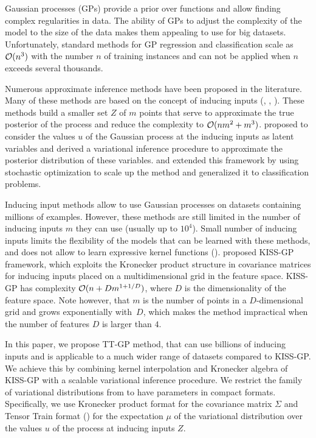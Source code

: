 Gaussian processes (GPs) provide a prior over functions and allow finding complex
regularities in data. The ability of GPs to adjust the complexity of the model
to the size of the data makes them appealing to use for big datasets.
Unfortunately, standard methods for GP regression and classification scale as
$\mathcal{O}(n^3)$ with the number $n$ of training instances and can not be applied when $n$
exceeds several thousands.

Numerous approximate inference methods have been proposed in the literature. Many
of these methods are based on the concept of inducing inputs (\citet{candela2005},
\citet{snelson2006}, \citet{williams2000}). These methods build a smaller set
$Z$ of $m$ points that serve to approximate the true posterior of the process
and reduce the complexity to $\mathcal{O}(nm^2 + m^3)$. \citet{titsias2009} proposed
to consider the values $u$ of the Gaussian process at the inducing inputs
as latent variables and derived a variational inference procedure to approximate
the posterior distribution of these variables. \citet{hensman2013} and
\citet{hensman2015} extended this framework by using stochastic optimization to
scale up the method and generalized it to classification problems.

Inducing input methods allow to use Gaussian processes on datasets containing
millions of examples. However, these methods are still limited in the number
of inducing inputs $m$ they can use (usually up to $10^4$). Small number of 
inducing inputs limits the flexibility of the models that can be learned with 
these methods, and does not allow to learn expressive kernel functions 
(\citet{wilson2014}). \citet{wilson2015} proposed KISS-GP
framework, which exploits the Kronecker product structure in covariance matrices
for inducing inputs placed on a multidimensional grid in the feature space.
KISS-GP has complexity $\mathcal{O}(n + D m^{1 + 1/D})$, where $D$ is the dimensionality
of the feature space. Note however, that $m$ is the number of points in a
$D$-dimensional grid and grows exponentially with~$D$, which makes the method
impractical when the number of features $D$ is larger than $4$.

In this paper, we propose TT-GP method, that can use billions of inducing
inputs and is applicable to a much wider range of datasets compared to
KISS-GP.
We achieve this by combining kernel interpolation and Kronecker algebra of 
KISS-GP with a scalable variational inference procedure. We restrict the family of
variational distributions from \citet{hensman2013} to have parameters in
compact formats. Specifically, we use Kronecker product format for the
covariance matrix $\Sigma$ and Tensor Train format (\citet{oseledets2011}) for the
expectation $\mu$ of the variational distribution over the values $u$ of the
process at inducing inputs $Z$. 

